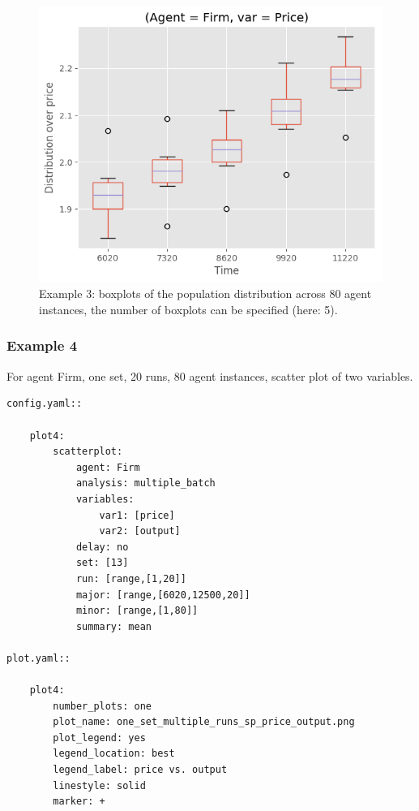 \documentclass[10pt,a4paper]{article}
\begin{document}
\begin{figure}[b!]\centering\leavevmode
\includegraphics[scale=.7]{./plots_tut_2/one_set_one_run_bp_price_price.png}
\caption{\footnotesize  Example 3: boxplots of the population distribution across 80 agent instances, the number of boxplots can be specified (here: 5).}
\end{figure}

\clearpage
\subsubsection{Example 4}
For agent Firm, one set, 20 runs, 80 agent instances, scatter plot of two variables.

\begin{lstlisting}
config.yaml::

    plot4:
        scatterplot:
            agent: Firm
            analysis: multiple_batch
            variables:
                var1: [price]
                var2: [output]
            delay: no    
            set: [13]
            run: [range,[1,20]]
            major: [range,[6020,12500,20]]
            minor: [range,[1,80]] 
            summary: mean

plot.yaml::

    plot4:
        number_plots: one
        plot_name: one_set_multiple_runs_sp_price_output.png
        plot_legend: yes
        legend_location: best
        legend_label: price vs. output
        linestyle: solid
        marker: +
\end{lstlisting}
\end{document}
